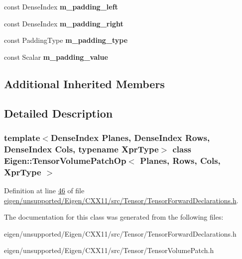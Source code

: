 \begin{DoxyCompactItemize}
\item 
\mbox{\label{class_eigen_1_1_tensor_volume_patch_op_a8de225a9efdda093875e5a780344348d}} 
const Dense\+Index {\bfseries m\+\_\+padding\+\_\+left}
\item 
\mbox{\label{class_eigen_1_1_tensor_volume_patch_op_a66f2841add24fbbf0da17a5791af4353}} 
const Dense\+Index {\bfseries m\+\_\+padding\+\_\+right}
\item 
\mbox{\label{class_eigen_1_1_tensor_volume_patch_op_a63360711d8981f19d563148b08f529d6}} 
const Padding\+Type {\bfseries m\+\_\+padding\+\_\+type}
\item 
\mbox{\label{class_eigen_1_1_tensor_volume_patch_op_a97a00c58d939f33941be96f8982c871b}} 
const Scalar {\bfseries m\+\_\+padding\+\_\+value}
\end{DoxyCompactItemize}
\subsection*{Additional Inherited Members}


\subsection{Detailed Description}
\subsubsection*{template$<$Dense\+Index Planes, Dense\+Index Rows, Dense\+Index Cols, typename Xpr\+Type$>$\newline
class Eigen\+::\+Tensor\+Volume\+Patch\+Op$<$ Planes, Rows, Cols, Xpr\+Type $>$}



Definition at line \hyperlink{eigen_2unsupported_2_eigen_2_c_x_x11_2src_2_tensor_2_tensor_forward_declarations_8h_source_l00046}{46} of file \hyperlink{eigen_2unsupported_2_eigen_2_c_x_x11_2src_2_tensor_2_tensor_forward_declarations_8h_source}{eigen/unsupported/\+Eigen/\+C\+X\+X11/src/\+Tensor/\+Tensor\+Forward\+Declarations.\+h}.



The documentation for this class was generated from the following files\+:\begin{DoxyCompactItemize}
\item 
eigen/unsupported/\+Eigen/\+C\+X\+X11/src/\+Tensor/\+Tensor\+Forward\+Declarations.\+h\item 
eigen/unsupported/\+Eigen/\+C\+X\+X11/src/\+Tensor/\+Tensor\+Volume\+Patch.\+h\end{DoxyCompactItemize}
